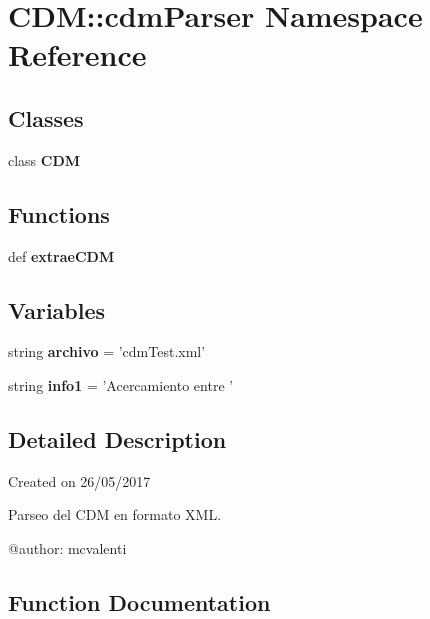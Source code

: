 \section{\-C\-D\-M\-:\-:cdm\-Parser \-Namespace \-Reference}
\label{namespace_c_d_m_1_1cdm_parser}
\subsection*{\-Classes}
\begin{DoxyCompactItemize}
\item 
class {\bf \-C\-D\-M}
\end{DoxyCompactItemize}
\subsection*{\-Functions}
\begin{DoxyCompactItemize}
\item 
def {\bf extrae\-C\-D\-M}
\end{DoxyCompactItemize}
\subsection*{\-Variables}
\begin{DoxyCompactItemize}
\item 
string {\bf archivo} = 'cdm\-Test.\-xml'
\item 
string {\bf info1} = '\-Acercamiento entre '
\end{DoxyCompactItemize}


\subsection{\-Detailed \-Description}
\begin{DoxyVerb}
Created on 26/05/2017

Parseo del CDM en formato XML.

@author: mcvalenti
\end{DoxyVerb}
 

\subsection{\-Function \-Documentation}
